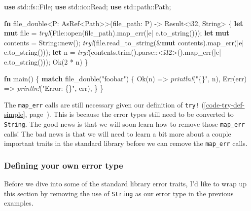 \documentclass[a4paper,]{book}
\renewcommand*{\hypertarget}[3][\ar]{%
  \def\ar{#2}%
  \label{#1}%
  #3}
\renewcommand*{\hyperlink}[2]{%
 #2 (\autoref{#1}, page~\pageref{#1})}
\newenvironment{Shaded}{\begin{snugshade}}{\end{snugshade}}
\newcommand{\KeywordTok}[1]{\textcolor[rgb]{0.13,0.29,0.53}{\textbf{{#1}}}}
\newcommand{\DataTypeTok}[1]{\textcolor[rgb]{0.13,0.29,0.53}{{#1}}}
\newcommand{\DecValTok}[1]{\textcolor[rgb]{0.00,0.00,0.81}{{#1}}}
\newcommand{\ConstantTok}[1]{\textcolor[rgb]{0.00,0.00,0.00}{{#1}}}
\newcommand{\StringTok}[1]{\textcolor[rgb]{0.31,0.60,0.02}{{#1}}}
\newcommand{\PreprocessorTok}[1]{\textcolor[rgb]{0.56,0.35,0.01}{\textit{{#1}}}}
\newcommand{\NormalTok}[1]{{#1}}
\begin{document}
\begin{Shaded}
\begin{Highlighting}[]
\KeywordTok{use} \NormalTok{std::fs::File;}
\KeywordTok{use} \NormalTok{std::io::Read;}
\KeywordTok{use} \NormalTok{std::path::Path;}

\KeywordTok{fn} \NormalTok{file_double<P: AsRef<Path>>(file_path: P) -> }\DataTypeTok{Result}\NormalTok{<}\DataTypeTok{i32}\NormalTok{, }\DataTypeTok{String}\NormalTok{> \{}
    \KeywordTok{let} \KeywordTok{mut} \NormalTok{file = }\PreprocessorTok{try!}\NormalTok{(File::open(file_path).map_err(|e| e.to_string()));}
    \KeywordTok{let} \KeywordTok{mut} \NormalTok{contents = }\DataTypeTok{String}\NormalTok{::new();}
    \PreprocessorTok{try!}\NormalTok{(file.read_to_string(&}\KeywordTok{mut} \NormalTok{contents).map_err(|e| e.to_string()));}
    \KeywordTok{let} \NormalTok{n = }\PreprocessorTok{try!}\NormalTok{(contents.trim().parse::<}\DataTypeTok{i32}\NormalTok{>().map_err(|e| e.to_string()));}
    \ConstantTok{Ok}\NormalTok{(}\DecValTok{2} \NormalTok{* n)}
\NormalTok{\}}

\KeywordTok{fn} \NormalTok{main() \{}
    \KeywordTok{match} \NormalTok{file_double(}\StringTok{"foobar"}\NormalTok{) \{}
        \ConstantTok{Ok}\NormalTok{(n) => }\PreprocessorTok{println!}\NormalTok{(}\StringTok{"\{\}"}\NormalTok{, n),}
        \ConstantTok{Err}\NormalTok{(err) => }\PreprocessorTok{println!}\NormalTok{(}\StringTok{"Error: \{\}"}\NormalTok{, err),}
    \NormalTok{\}}
\NormalTok{\}}
\end{Highlighting}
\end{Shaded}

The \texttt{map\_err} calls are still necessary given
\protect\hyperlink{code-try-def-simple}{our definition of
\texttt{try!}}. This is because the error types still need to be
converted to \texttt{String}. The good news is that we will soon learn
how to remove those \texttt{map\_err} calls! The bad news is that we
will need to learn a bit more about a couple important traits in the
standard library before we can remove the \texttt{map\_err} calls.

\hypertarget{defining-your-own-error-type}{\subsubsection{Defining your
own error type}\label{defining-your-own-error-type}}

Before we dive into some of the standard library error traits, I'd like
to wrap up this section by removing the use of \texttt{String} as our
error type in the previous examples.
\end{document}
